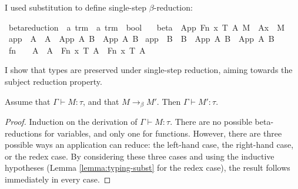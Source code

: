 I used substitution to define single-step \(\beta\)-reduction:

\begin{implementation}
\isamarkupfalse%
\ beta{\isacharunderscore}reduction\ {\isacharcolon}{\isacharcolon}\ {\isachardoublequoteopen}{\isacharprime}a\ trm\ {\isasymRightarrow}\ {\isacharprime}a\ trm\ {\isasymRightarrow}\ bool{\isachardoublequoteclose}\ \isanewline
\ \ beta{\isacharcolon}\ \ {\isachardoublequoteopen}{\isacharparenleft}App\ {\isacharparenleft}Fn\ x\ T\ A{\isacharparenright}\ M{\isacharparenright}\ {\isasymrightarrow}{\isasymbeta}\ {\isacharparenleft}A{\isacharbrackleft}x\ {\isacharcolon}{\isacharcolon}{\isacharequal}\ M{\isacharbrackright}{\isacharparenright}{\isachardoublequoteclose}\isanewline
{\isacharbar}\ app{}{\isacharcolon}\ \ {\isachardoublequoteopen}A\ {\isasymrightarrow}{\isasymbeta}\ A{\isacharprime}\ {\isasymLongrightarrow}\ {\isacharparenleft}App\ A\ B{\isacharparenright}\ {\isasymrightarrow}{\isasymbeta}\ {\isacharparenleft}App\ A{\isacharprime}\ B{\isacharparenright}{\isachardoublequoteclose}\isanewline
{\isacharbar}\ app{}{\isacharcolon}\ \ {\isachardoublequoteopen}B\ {\isasymrightarrow}{\isasymbeta}\ B{\isacharprime}\ {\isasymLongrightarrow}\ {\isacharparenleft}App\ A\ B{\isacharparenright}\ {\isasymrightarrow}{\isasymbeta}\ {\isacharparenleft}App\ A\ B{\isacharprime}{\isacharparenright}{\isachardoublequoteclose}\isanewline
{\isacharbar}\ fn{\isacharcolon}\ \ \ \ {\isachardoublequoteopen}A\ {\isasymrightarrow}{\isasymbeta}\ A{\isacharprime}\ {\isasymLongrightarrow}\ {\isacharparenleft}Fn\ x\ T\ A{\isacharparenright}\ {\isasymrightarrow}{\isasymbeta}\ {\isacharparenleft}Fn\ x\ T\ A{\isacharprime}{\isacharparenright}{\isachardoublequoteclose}
\end{implementation}

I show that types are preserved under single-step reduction, aiming towards the subject reduction property.

\begin{lemma}
\label{lemma:preservation'}
Assume that \(\Gamma \vdash M : \tau\), and that \(M \to_\beta M'\).
Then \(\Gamma \vdash M' : \tau\).
\end{lemma}
\begin{proof}
Induction on the derivation of \(\Gamma \vdash M : \tau\).
There are no possible beta-reductions for variables, and only one for functions.
However, there are three possible ways an application can reduce: the left-hand case, the right-hand case, or the redex case.
By considering these three cases and using the inductive hypotheses (Lemma \ref{lemma:typing-subst} for the redex case), the result follows immediately in every case.
\end{proof}

